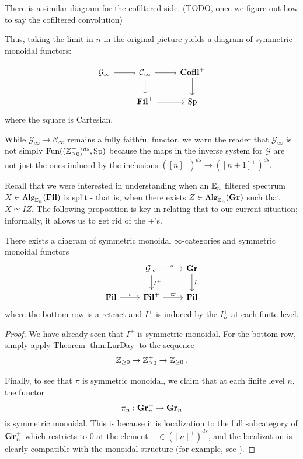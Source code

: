 There is a similar diagram for the cofiltered side. (TODO, once we figure out how to say the cofiltered convolution) %

Thus, taking the limit in $n$ in the original picture yields a diagram of symmetric monoidal functors:

$$%
\begin{tikzcd}
\mathcal{G}_\infty \arrow[r] &\C_\infty \arrow[r] \arrow[d]&  \Cofil^+ \arrow[d]\\
& \Fil^+ \arrow[r]& \Sp
\end{tikzcd}
$$
where the square is Cartesian.

\begin{rmk}
While $\mathcal{G}_\infty \to \mathcal{C}_\infty$ remains a fully faithful functor, we warn the reader that $\mathcal{G}_\infty$ is not simply $\operatorname{\text{Fun}}((\operatorname{\mathbb{Z}}_{\geq 0}^+)^{ds}, \operatorname{\text{Sp}})$ because the maps in the inverse system for $\mathcal{G}$ are not just the ones induced by the inclusions $([n]^+)^{ds} \to ([n+1]^+)^{ds}.$
\end{rmk}


Recall that we were interested in understanding when an $\operatorname{\mathbb{E}}_n$ filtered spectrum $X\in \operatorname{\text{Alg}}_{\operatorname{\mathbb{E}}_n}(\operatorname{\textbf{Fil}})$ is split - that is, when there exists $Z\in \operatorname{\text{Alg}}_{\operatorname{\mathbb{E}}_n}(\operatorname{\textbf{Gr}})$ such that $X \simeq IZ.$  The following proposition is key in relating that to our current situation; informally, it allows us to get rid of the +'s.

\begin{prop}\label{prop:MonRet}
There exists a diagram of symmetric monoidal $\infty$-categories and symmetric monoidal functors 
$$
\begin{tikzcd}
&\mathcal{G}_\infty \arrow[r,"\pi"] \arrow[d, "I^+"]&  \Gr \arrow[d, "I"]\\
\Fil \arrow[r,"\iota"] & \Fil^+ \arrow[r,"\varpi"]& \Fil
\end{tikzcd}
$$
where the bottom row is a retract and $I^+$ is induced by the $I_n^+$ at each finite level.  
\end{prop} 
\begin{proof}
We have already seen that $I^+$ is symmetric monoidal.  For the bottom row, simply apply Theorem \ref{thm:LurDay} to the sequence $$\operatorname{\mathbb{Z}}_{\geq 0} \to \operatorname{\mathbb{Z}}_{\geq 0}^+ \to \operatorname{\mathbb{Z}}_{\geq 0}.$$

Finally, to see that $\pi$ is symmetric monoidal, we claim that at each finite level $n$, the functor $$\pi_n: \operatorname{\textbf{Gr}}_n^+ \to \operatorname{\textbf{Gr}}_n$$ is symmetric monoidal.  This is because it is localization to the full subcategory of $\operatorname{\textbf{Gr}}_n^+$ which restricts to $0$ at the element $+\in ([n]^+)^{ds}$, and the localization is clearly compatible with the monoidal structure (for example, see \cite[Proposition 2.2.1.9]{HA}).%



\end{proof}


